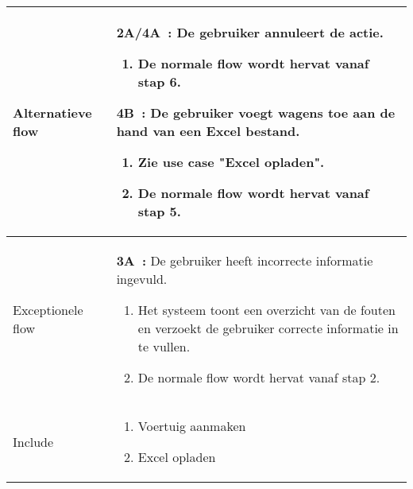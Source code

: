 \documentclass{article}
\begin{document}
\begin{tabularx}{\textwidth}{ | l | X |}
 Alternatieve flow & 
 \textbf{2A/4A~:} De gebruiker annuleert de actie.
 \begin{enumerate}[label=\alph*]
 	\item De normale flow wordt hervat vanaf stap 6.
 \end{enumerate}
 \textbf{4B~:} De gebruiker voegt wagens toe aan de hand van een Excel bestand. 
 	\begin{enumerate}[label=\alph*]
 		\item Zie use case "Excel opladen".
        \item De normale flow wordt hervat vanaf stap 5.
 	\end{enumerate}\\ 
 \hline
 
 Exceptionele flow & 
 \textbf{3A~:} De gebruiker heeft incorrecte informatie ingevuld.
 	\begin{enumerate}[label=\alph*]
 		\item Het systeem toont een overzicht van de fouten en verzoekt de gebruiker correcte informatie in te vullen.
        \item De normale flow wordt hervat vanaf stap 2.
 	\end{enumerate}
 \\ 
 \hline
 
 Include & 
 
 \begin{enumerate}
 	\item Voertuig aanmaken
    \item Excel opladen
 \end{enumerate}\\ 
 \hline
\end{tabularx}

\newpage
\end{document}
